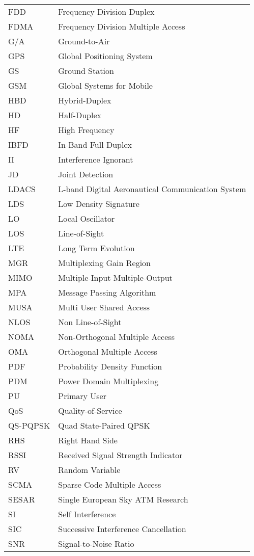 \begin{longtable}{ll}
FDD	& Frequency Division Duplex\\
FDMA	& Frequency Division Multiple Access\\
G/A	& Ground-to-Air\\
GPS	& Global Positioning System\\
GS	& Ground Station\\
GSM	& Global Systems for Mobile\\
HBD	& Hybrid-Duplex\\
HD	& Half-Duplex\\
HF	& High Frequency\\
IBFD	& In-Band Full Duplex\\
II	& Interference Ignorant\\
JD	& Joint Detection\\
LDACS	& L-band Digital Aeronautical Communication System\\
LDS	& Low Density Signature\\
LO	& Local Oscillator\\
LOS	& Line-of-Sight\\
LTE	& Long Term Evolution\\
MGR	& Multiplexing Gain Region\\
MIMO	& Multiple-Input Multiple-Output\\
MPA	& Message Passing Algorithm\\
MUSA	& Multi User Shared Access\\
NLOS	& Non Line-of-Sight\\
NOMA	& Non-Orthogonal Multiple Access\\
OMA	& Orthogonal Multiple Access\\
PDF	& Probability Density Function\\
PDM	& Power Domain Multiplexing\\
PU	& Primary User\\
QoS	& Quality-of-Service\\
QS-PQPSK	& Quad State-Paired QPSK\\
RHS	& Right Hand Side\\
RSSI	& Received Signal Strength Indicator\\
RV	& Random Variable\\
SCMA	& Sparse Code Multiple Access\\
SESAR	& Single European Sky ATM Research\\
SI	& Self Interference\\
SIC	& Successive Interference Cancellation\\
SNR	& Signal-to-Noise Ratio\\

\end{longtable}

